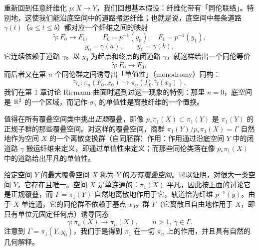 
重新回到任意纤维化 $p:X\to Y$，我们回想基本假设：纤维化带有「同伦联络」。特别地，这使我们能沿底空间中的道路搬运纤维；也就是说，底空间中每条道路 $\gamma(t)$（$a\le t\le b$）都对应一个纤维之间的映射
\[
  \tilde\gamma:F_0\to F_1,\qquad F_0=p^{-1}(y_0),\quad F_1=p^{-1}(y_1),
\]
\[
  y_0=\gamma(a),\qquad y_1=\gamma(b),
\]
它连续依赖于道路 $\gamma$。以 $y_0$ 为起点和终点的闭道路 $\gamma$，就这样给出一个同伦等价
\[
  \tilde\gamma:F_0\to F_0,
\]
而后者又在第 $n$ 个同伦群之间诱导出「单值性」（monodromy）同构：
\[
  \tilde\gamma_*:\pi_n(F_0,x_0)\to\pi_n(F_0,\tilde\gamma(x_0)).
\]
我们在第 1 章讨论 Riemann 曲面时遇到过这一现象的特例：那里 $n=0$，底空间是 $\mathbb{R}^2$ 的一个区域，而记作 $\sigma_\gamma$ 的单值性是离散纤维的一个置换。

值得在所有覆叠空间类中挑出\emph{正规}覆叠，即像 $p_*\pi_1(X)\subset\pi_1(Y)$ 是 $\pi_1(Y)$ 的正规子群的那些覆叠空间。对这样的覆叠空间，商群 $\pi_1(Y)/p_*\pi_1(X)=\Gamma$ 自然地作为空间 $X$ 的一个离散变换群（自同胚群）作用：作用通过沿底空间 $Y$ 中的闭道路 $\gamma$ 搬运纤维来定义，即通过单值性来定义；而那些同伦类落在像 $p_*\pi_1(X)$ 中的道路给出平凡的单值性。

给定空间 $Y$ 的最大覆叠空间 $X$ 称为 $Y$ 的\emph{万有覆叠空间}。可以证明，对很大一类空间 $Y$，它存在且唯一。空间 $X$ 是单连通的：$\pi_1(X)$ 平凡，因此按上面的讨论它是正规覆叠，而 $\Gamma=\pi_1(Y)$ 自然地离散地作用于它，轨道恰为纤维 $p^{-1}(y)$。由于 $X$ 单连通，它的同伦群不依赖于基点 $x_0$。群 $\Gamma$（它离散且自由地作用于 $X$，即只有单位元固定任何点）诱导同态
\[
  \gamma:\pi_n(X)\to\pi_n(X),\qquad n>1,\ \gamma\in\Gamma.
\]
注意到 $\Gamma=\pi_1(Y,y_0)$，我们于是得到 $\pi_1$ 在一切 $\pi_n$ 上的作用，并且具有自然的几何解释。

